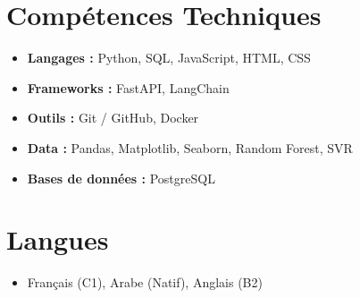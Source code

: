 \documentclass[a4paper,11pt]{article}
\begin{document}
\section*{Compétences Techniques}
\begin{itemize}[leftmargin=*, noitemsep]
    \item \textbf{Langages :} Python, SQL, JavaScript, HTML, CSS
    \item \textbf{Frameworks :} FastAPI, LangChain
    \item \textbf{Outils :} Git / GitHub, Docker
    \item \textbf{Data :} Pandas, Matplotlib, Seaborn, Random Forest, SVR
    \item \textbf{Bases de données :} PostgreSQL
\end{itemize}

\section*{Langues}
\begin{itemize}[leftmargin=*, noitemsep]
    \item Français (C1), Arabe (Natif), Anglais (B2)
\end{itemize}
\end{document}
